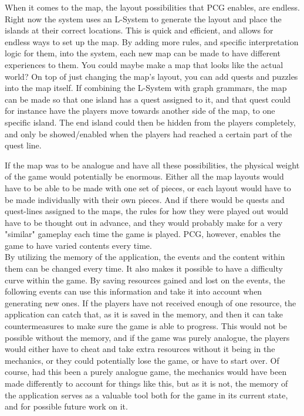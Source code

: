When it comes to the map, the layout possibilities that PCG enables, are endless. Right now the system uses an L-System to generate the layout and place the islands at their correct locations. This is quick and efficient, and allows for endless ways to set up the map. By adding more rules, and specific interpretation logic for them, into the system, each new map can be made to have different experiences to them. You could maybe make a map that looks like the actual world? 
On top of just changing the map's layout, you can add quests and puzzles into the map itself. If combining the L-System with graph grammars, the map can be made so that one island has a quest assigned to it, and that quest could for instance have the players move towards another side of the map, to one specific island. The end island could then be hidden from the players completely, and only be showed/enabled when the players had reached a certain part of the quest line.

If the map was to be analogue and have all these possibilities, the physical weight of the game would potentially be enormous. Either all the map layouts would have to be able to be made with one set of pieces, or each layout would have to be made individually with their own pieces. And if there would be quests and quest-lines assigned to the maps, the rules for how they were played out would have to be thought out in advance, and they would probably make for a very "similar" gameplay each time the game is played. PCG, however, enables the game to have varied contents every time.\\

By utilizing the memory of the application, the events and the content within them can be changed every time. It also makes it possible to have a difficulty curve within the game. By saving resources gained and lost on the events, the following events can use this information and take it into account when generating new ones. If the players have not received enough of one resource, the application can catch that, as it is saved in the memory, and then it can take countermeasures to make sure the game is able to progress. This would not be possible without the memory, and if the game was purely analogue, the players would either have to cheat and take extra resources without it being in the mechanics, or they could potentially lose the game, or have to start over. Of course, had this been a purely analogue game, the mechanics would have been made differently to account for things like this, but as it is not, the memory of the application serves as a valuable tool both for the game in its current state, and for possible future work on it.


